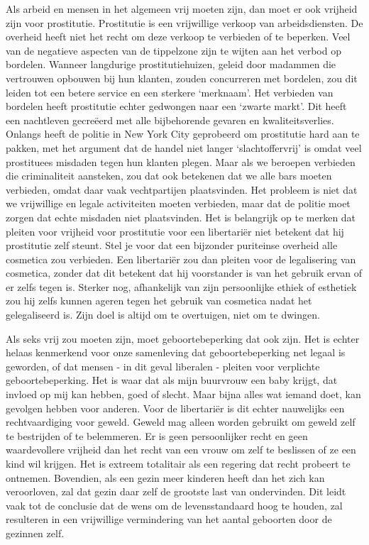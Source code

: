 \documentclass[
  a5paper,
  smalldemyvopaper,10pt,twoside,onecolumn,openright,extrafontsizes,hidelinks]{memoir}
\begin{document}
Als arbeid en mensen in het algemeen vrij moeten zijn, dan moet er ook
vrijheid zijn voor prostitutie. Prostitutie is een vrijwillige verkoop
van arbeidsdiensten. De overheid heeft niet het recht om deze verkoop te
verbieden of te beperken. Veel van de negatieve aspecten van de
tippelzone zijn te wijten aan het verbod op bordelen. Wanneer langdurige
prostitutiehuizen, geleid door madammen die vertrouwen opbouwen bij hun
klanten, zouden concurreren met bordelen, zou dit leiden tot een betere
service en een sterkere `merknaam'. Het verbieden van bordelen heeft
prostitutie echter gedwongen naar een `zwarte markt'. Dit heeft een
nachtleven gecreëerd met alle bijbehorende gevaren en kwaliteitsverlies.
Onlangs heeft de politie in New York City geprobeerd om prostitutie hard
aan te pakken, met het argument dat de handel niet langer
`slachtoffervrij' is omdat veel prostituees misdaden tegen hun klanten
plegen. Maar als we beroepen verbieden die criminaliteit aansteken, zou
dat ook betekenen dat we alle bars moeten verbieden, omdat daar vaak
vechtpartijen plaatsvinden. Het probleem is niet dat we vrijwillige en
legale activiteiten moeten verbieden, maar dat de politie moet zorgen
dat echte misdaden niet plaatsvinden. Het is belangrijk op te merken dat
pleiten voor vrijheid voor prostitutie voor een libertariër niet
betekent dat hij prostitutie zelf steunt. Stel je voor dat een bijzonder
puriteinse overheid alle cosmetica zou verbieden. Een libertariër zou
dan pleiten voor de legalisering van cosmetica, zonder dat dit betekent
dat hij voorstander is van het gebruik ervan of er zelfs tegen is.
Sterker nog, afhankelijk van zijn persoonlijke ethiek of esthetiek zou
hij zelfs kunnen ageren tegen het gebruik van cosmetica nadat het
gelegaliseerd is. Zijn doel is altijd om te overtuigen, niet om te
dwingen.

Als seks vrij zou moeten zijn, moet geboortebeperking dat ook zijn. Het
is echter helaas kenmerkend voor onze samenleving dat geboortebeperking
net legaal is geworden, of dat mensen - in dit geval liberalen - pleiten
voor verplichte geboortebeperking. Het is waar dat als mijn buurvrouw
een baby krijgt, dat invloed op mij kan hebben, goed of slecht. Maar
bijna alles wat iemand doet, kan gevolgen hebben voor anderen. Voor de
libertariër is dit echter nauwelijks een rechtvaardiging voor geweld.
Geweld mag alleen worden gebruikt om geweld zelf te bestrijden of te
belemmeren. Er is geen persoonlijker recht en geen waardevollere
vrijheid dan het recht van een vrouw om zelf te beslissen of ze een kind
wil krijgen. Het is extreem totalitair als een regering dat recht
probeert te ontnemen. Bovendien, als een gezin meer kinderen heeft dan
het zich kan veroorloven, zal dat gezin daar zelf de grootste last van
ondervinden. Dit leidt vaak tot de conclusie dat de wens om de
levensstandaard hoog te houden, zal resulteren in een vrijwillige
vermindering van het aantal geboorten door de gezinnen zelf.
\end{document}

